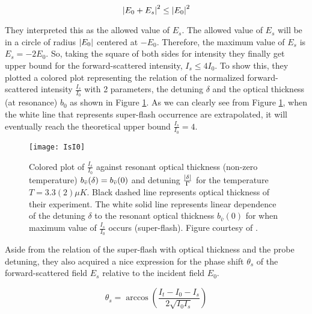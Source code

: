 \begin{equation}
    \abs{E_{0} + E_{s}}^{2} \leq \abs{E_{0}}^{2}
\end{equation}

They interpreted this as the allowed value of $E_{s}$. The allowed value of $E_{s}$ will be in a circle of radius $\abs{E_{0}}$ centered at $-E_{0}$. Therefore, the maximum value of $E_{s}$ is $E_{s} = -2 E_{0}$. So, taking the square of both sides for intensity they finally get upper bound for the forward-scattered intensity, $I_{s} \leq 4 I_{0}$. To show this, they plotted a colored plot representing the relation of the normalized forward-scattered intensity $\frac{I_{s}}{I_{0}}$ with 2 parameters, the detuning $\delta$ and the optical thickness (at resonance) $b_{0}$ as shown in Figure \ref{fig: I_s/I_0}. As we can clearly see from Figure \ref{fig: I_s/I_0}, when the white line that represents super-flash occurrence are extrapolated, it will eventually reach the theoretical upper bound $\frac{I_{s}}{I_{0}} = 4$.\\

\newpage

\begin{figure}[h!]
    \centering
    \texttt{[image: IsI0]}
    \caption{Colored plot of $\frac{I_{s}}{I_{0}}$  against resonant optical thickness (non-zero temperature) $b_{\bar{v}}(\delta) = b_{\Bar{v}}(0)$ and detuning $\frac{\abs{\delta}}{\Gamma}$ for the temperature $T = 3.3(2) \mu K$. Black dashed line represents optical thickness of their experiment. The white solid line represents linear dependence of the detuning $\delta$ to the resonant optical thickness $b_{\bar{v}}(0)$ for when maximum value of $\frac{I_{s}}{I_{0}}$ occurs (super-flash). Figure courtesy of \cite{Kwong2014}.}
    \label{fig: I_s/I_0}
\end{figure}

Aside from the relation of the super-flash with optical thickness and the probe detuning, they also acquired a nice expression for the phase shift $\theta_{s}$ of the forward-scattered field $E_{s}$ relative to the incident field $E_{0}$. 

\begin{equation}
    \theta_{s} = \arccos({\frac{I_{t} - I_{0} - I_{s}}{2 \sqrt{I_{0} I_{s}}}})
\end{equation}

